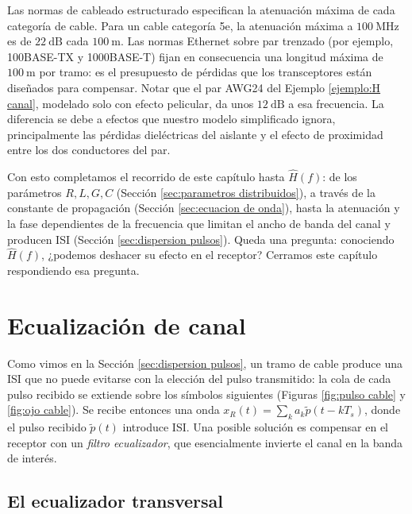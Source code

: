 \begin{ejemplo}\label{ejemplo:ethernet}
Las normas de cableado estructurado especifican la atenuación máxima de cada categoría de cable. Para un cable categoría 5e, la atenuación máxima a $100\ \unit{\mega\hertz}$ es de $22\ \unit{\deci\bel}$ cada $100\ \unit{\meter}$.
Las normas Ethernet sobre par trenzado (por ejemplo, 100BASE-TX y 1000BASE-T) fijan en consecuencia una longitud máxima de $100\ \unit{\meter}$ por tramo: es el presupuesto de pérdidas que los transceptores están diseñados para compensar. Notar que el par AWG24 del Ejemplo \ref{ejemplo:H canal}, modelado solo con efecto pelicular, da unos $12\ \unit{\deci\bel}$ a esa frecuencia. La diferencia se debe a efectos que nuestro modelo simplificado ignora, principalmente las pérdidas dieléctricas del aislante y el efecto de proximidad entre los dos conductores del par.
\end{ejemplo}

Con esto completamos el recorrido de este capítulo hasta $\hat H(f)$: de los parámetros $R,L,G,C$ (Sección \ref{sec:parametros distribuidos}), a través de la constante de propagación (Sección \ref{sec:ecuacion de onda}), hasta la atenuación y la fase dependientes de la frecuencia que limitan el ancho de banda del canal y producen ISI (Sección \ref{sec:dispersion pulsos}). Queda una pregunta: conociendo $\hat H(f)$, ¿podemos deshacer su efecto en el receptor? Cerramos este capítulo respondiendo esa pregunta.

\section{Ecualización de canal}\label{sec:ecualizacion}

Como vimos en la Sección \ref{sec:dispersion pulsos}, un tramo de cable produce una ISI que no puede evitarse con la elección del pulso transmitido: la cola de cada pulso recibido se extiende sobre los símbolos siguientes (Figuras \ref{fig:pulso cable} y \ref{fig:ojo cable}). Se recibe entonces una onda $x_R(t) = \sum_k a_k \tilde{p}(t-kT_s)$, donde el pulso recibido $\tilde{p}(t)$ introduce ISI. Una posible solución es compensar en el receptor con un \emph{filtro ecualizador}, que esencialmente invierte el canal en la banda de interés.

\subsection*{El ecualizador transversal}

